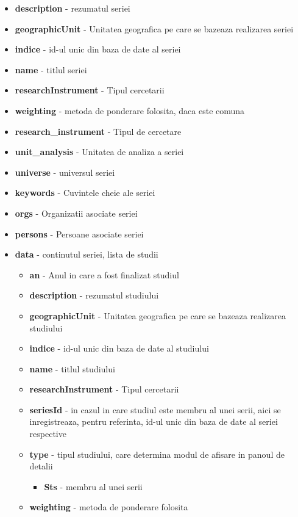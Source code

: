 \begin{itemize}
\item \textbf{description} - rezumatul seriei 
\item \textbf{geographicUnit} - Unitatea geografica pe care se bazeaza realizarea
seriei 
\item \textbf{indice} - id-ul unic din baza de date al seriei 
\item \textbf{name} - titlul seriei 
\item \textbf{researchInstrument} - Tipul cercetarii 
\item \textbf{weighting} - metoda de ponderare folosita, daca este comuna 
\item \textbf{research\_instrument} - Tipul de cercetare 
\item \textbf{unit\_analysis} - Unitatea de analiza a seriei 
\item \textbf{universe} - universul seriei 
\item \textbf{keywords} - Cuvintele cheie ale seriei 
\item \textbf{orgs }- Organizatii asociate seriei 
\item \textbf{persons} - Persoane asociate seriei 
\item \textbf{data} - continutul seriei, lista de studii 

\begin{itemize}
\item \textbf{an} - Anul in care a fost finalizat studiul 
\item \textbf{description} - rezumatul studiului 
\item \textbf{geographicUnit} - Unitatea geografica pe care se bazeaza realizarea
studiului 
\item \textbf{indice} - id-ul unic din baza de date al studiului 
\item \textbf{name} - titlul studiului 
\item \textbf{researchInstrument} - Tipul cercetarii 
\item \textbf{seriesId} - in cazul in care studiul este membru al unei serii,
aici se inregistreaza, pentru referinta, id-ul unic din baza de date
al seriei respective 
\item \textbf{type} - tipul studiului, care determina modul de afisare in
panoul de detalii 

\begin{itemize}
\item \textbf{Sts} - membru al unei serii 
\end{itemize}
\item \textbf{weighting} - metoda de ponderare folosita 
\end{itemize}
\end{itemize}

